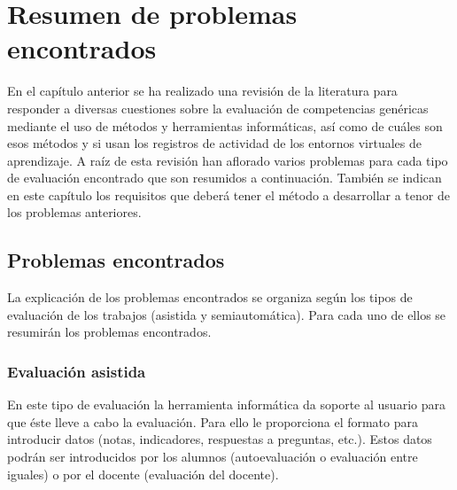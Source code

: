 


\chapter{Resumen de problemas encontrados}
\label{cha:Problemas}

\ifpdf
    \graphicspath{{3_problemas/figures/PNG/}{3_problemas/figures/PDF/}{3_problemas/figures/}}
\else
    \graphicspath{{3_problemas/figures/EPS/}{3_problemas/figures/}}
\fi



En el capítulo anterior se ha realizado una revisión de la literatura para responder a diversas cuestiones sobre la evaluación de competencias genéricas mediante el uso de métodos y herramientas informáticas, así como de cuáles son esos métodos y si usan los registros de actividad de los entornos virtuales de aprendizaje. A raíz de esta revisión han aflorado varios problemas para cada tipo de evaluación encontrado que son resumidos a continuación. También se indican en este capítulo los requisitos que deberá tener el método a desarrollar a tenor de los problemas anteriores.

\section{Problemas encontrados}

La explicación de los problemas encontrados se organiza según los tipos de evaluación de los trabajos (asistida y semiautomática). Para cada uno de ellos se resumirán los problemas encontrados.

\subsection{Evaluación asistida} %

En este tipo de evaluación la herramienta informática da soporte al usuario para que éste lleve a cabo la evaluación. Para ello le proporciona el formato para introducir datos (notas, indicadores, respuestas a preguntas, etc.). Estos datos podrán ser introducidos por los alumnos (autoevaluación o evaluación entre iguales) o por el docente (evaluación del docente).

